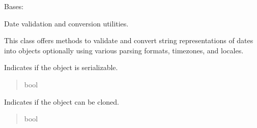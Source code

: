 \documentclass[letterpaper,10pt,english]{sphinxmanual}
\begin{document}
\begin{fulllineitems}
\label{\detokenize{apache_commons_validator_python.routines:apache_commons_validator_python.routines.date_validator.DateValidator}}
\pysigstartsignatures
{}
\pysigstopsignatures
\sphinxAtStartPar
Bases: 

\sphinxAtStartPar
Date validation and conversion utilities.

\sphinxAtStartPar
This class offers methods to validate and convert string representations
of dates into  objects optionally using various parsing formats,
timezones, and locales.

\begin{fulllineitems}
\label{\detokenize{apache_commons_validator_python.routines:apache_commons_validator_python.routines.date_validator.DateValidator.serializable}}
\pysigstartsignatures
{}
\pysigstopsignatures
\sphinxAtStartPar
Indicates if the object is serializable.
\begin{quote}\begin{description}
\sphinxAtStartPar
bool

\end{description}\end{quote}

\end{fulllineitems}


\begin{fulllineitems}
\label{\detokenize{apache_commons_validator_python.routines:apache_commons_validator_python.routines.date_validator.DateValidator.cloneable}}
\pysigstartsignatures
{}
\pysigstopsignatures
\sphinxAtStartPar
Indicates if the object can be cloned.
\begin{quote}\begin{description}
\sphinxAtStartPar
bool


\end{description}
\end{quote}
\end{fulllineitems}
\end{fulllineitems}
\end{document}
